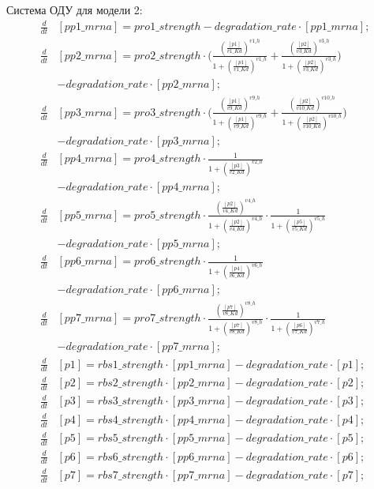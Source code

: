 Система ОДУ для модели 2:
\[ \begin{aligned}
  \frac{d}{dt}&[pp1\_mrna] = pro1\_strength - degradation\_rate \cdot [pp1\_mrna]; \\
  \frac{d}{dt}&[pp2\_mrna] = pro2\_strength 
    \cdot \biggl(\frac{(\frac{[p1]}{v1\_Kd})^{v1\_h}}{1+(\frac{[p1]}{v1\_Kd})^{v1\_h}} + 
    \frac{(\frac{[p2]}{v3\_Kd})^{v3\_h}}{1+(\frac{[p2]}{v3\_Kd})^{v3\_h}}\biggr) \\ 
    & - degradation\_rate \cdot [pp2\_mrna]; \\
  \frac{d}{dt}&[pp3\_mrna] = pro3\_strength 
    \cdot \biggl(\frac{(\frac{[p1]}{v9\_Kd})^{v9\_h}}{1+(\frac{[p1]}{v9\_Kd})^{v9\_h}} + 
    \frac{(\frac{[p2]}{v10\_Kd})^{v10\_h}}{1+(\frac{[p2]}{v10\_Kd})^{v10\_h}}\biggr) \\
    & - degradation\_rate \cdot [pp3\_mrna]; \\
  \frac{d}{dt}&[pp4\_mrna] = pro4\_strength 
    \cdot \frac{1}{1+(\frac{[p3]}{v2\_Kd})^{v2\_h}} \\
    & - degradation\_rate \cdot [pp4\_mrna]; \\
  \frac{d}{dt}&[pp5\_mrna] = pro5\_strength 
    \cdot \frac{(\frac{[p2]}{v4\_Kd })^{v4\_h }}{1+(\frac{[p2]}{v4\_Kd })^{v4\_h }} 
    \cdot \frac{1}{1+(\frac{[p5]}{v5\_Kd})^{v5\_h}} \\
    & - degradation\_rate \cdot [pp5\_mrna]; \\
  \frac{d}{dt}&[pp6\_mrna] = pro6\_strength 
    \cdot \frac{1}{1+(\frac{[p4]}{v6\_Kd})^{v6\_h}} \\
    & - degradation\_rate \cdot [pp6\_mrna]; \\
  \frac{d}{dt}&[pp7\_mrna] = pro7\_strength 
    \cdot \frac{(\frac{[p7]}{v8\_Kd })^{v8\_h }}{1+(\frac{[p7]}{v8\_Kd })^{v8\_h }} 
    \cdot \frac{1}{1+(\frac{[p6]}{v7\_Kd})^{v7\_h}} \\ 
    & - degradation\_rate \cdot [pp7\_mrna]; \\
  \frac{d}{dt}&[p1] = rbs1\_strength \cdot [pp1\_mrna] - degradation\_rate \cdot [p1]; \\
  \frac{d}{dt}&[p2] = rbs2\_strength \cdot [pp2\_mrna] - degradation\_rate \cdot [p2]; \\
  \frac{d}{dt}&[p3] = rbs3\_strength \cdot [pp3\_mrna] - degradation\_rate \cdot [p3]; \\
  \frac{d}{dt}&[p4] = rbs4\_strength \cdot [pp4\_mrna] - degradation\_rate \cdot [p4]; \\
  \frac{d}{dt}&[p5] = rbs5\_strength \cdot [pp5\_mrna] - degradation\_rate \cdot [p5]; \\
  \frac{d}{dt}&[p6] = rbs6\_strength \cdot [pp6\_mrna] - degradation\_rate \cdot [p6]; \\
  \frac{d}{dt}&[p7] = rbs7\_strength \cdot [pp7\_mrna] - degradation\_rate \cdot [p7]; \\
\end{aligned} \]

